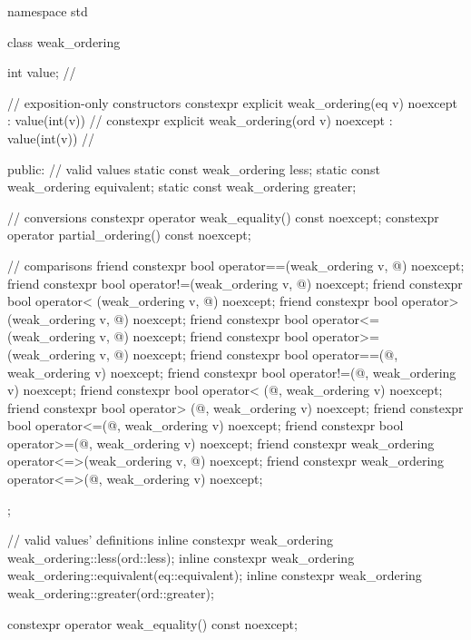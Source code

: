 %
%
%
%
\begin{codeblock}
namespace std {
  class weak_ordering {
    int value;  // \expos

    // exposition-only constructors
    constexpr explicit weak_ordering(eq v) noexcept : value(int(v)) {}  // \expos
    constexpr explicit weak_ordering(ord v) noexcept : value(int(v)) {} // \expos

  public:
    // valid values
    static const weak_ordering less;
    static const weak_ordering equivalent;
    static const weak_ordering greater;

    // conversions
    constexpr operator weak_equality() const noexcept;
    constexpr operator partial_ordering() const noexcept;

    // comparisons
    friend constexpr bool operator==(weak_ordering v, @\unspec@) noexcept;
    friend constexpr bool operator!=(weak_ordering v, @\unspec@) noexcept;
    friend constexpr bool operator< (weak_ordering v, @\unspec@) noexcept;
    friend constexpr bool operator> (weak_ordering v, @\unspec@) noexcept;
    friend constexpr bool operator<=(weak_ordering v, @\unspec@) noexcept;
    friend constexpr bool operator>=(weak_ordering v, @\unspec@) noexcept;
    friend constexpr bool operator==(@\unspec@, weak_ordering v) noexcept;
    friend constexpr bool operator!=(@\unspec@, weak_ordering v) noexcept;
    friend constexpr bool operator< (@\unspec@, weak_ordering v) noexcept;
    friend constexpr bool operator> (@\unspec@, weak_ordering v) noexcept;
    friend constexpr bool operator<=(@\unspec@, weak_ordering v) noexcept;
    friend constexpr bool operator>=(@\unspec@, weak_ordering v) noexcept;
    friend constexpr weak_ordering operator<=>(weak_ordering v, @\unspec@) noexcept;
    friend constexpr weak_ordering operator<=>(@\unspec@, weak_ordering v) noexcept;
  };

  // valid values' definitions
  inline constexpr weak_ordering weak_ordering::less(ord::less);
  inline constexpr weak_ordering weak_ordering::equivalent(eq::equivalent);
  inline constexpr weak_ordering weak_ordering::greater(ord::greater);
}
\end{codeblock}

%
\begin{itemdecl}
constexpr operator weak_equality() const noexcept;
\end{itemdecl}

